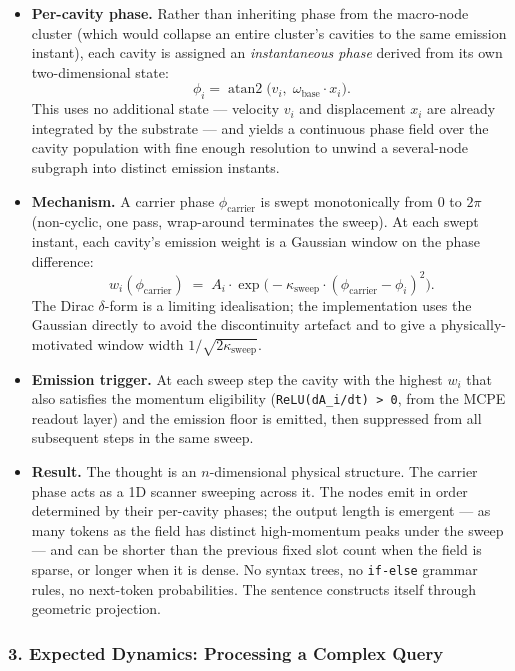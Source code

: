 \documentclass[
  11pt,
  a4paper,
]{article}
\begin{document}
\begin{itemize}
\item
  \textbf{Per-cavity phase.} Rather than inheriting phase from the
  macro-node cluster (which would collapse an entire cluster's cavities
  to the same emission instant), each cavity is assigned an
  \emph{instantaneous phase} derived from its own two-dimensional state:
  \[ \phi_i = \operatorname{atan2}\!\bigl(v_i,\; \omega_{\text{base}} \cdot x_i\bigr). \]
  This uses no additional state --- velocity \(v_i\) and displacement
  \(x_i\) are already integrated by the substrate --- and yields a
  continuous phase field over the cavity population with fine enough
  resolution to unwind a several-node subgraph into distinct emission
  instants.
\item
  \textbf{Mechanism.} A carrier phase \(\phi_{\text{carrier}}\) is swept
  monotonically from \(0\) to \(2\pi\) (non-cyclic, one pass,
  wrap-around terminates the sweep). At each swept instant, each
  cavity's emission weight is a Gaussian window on the phase difference:
  \[ w_i(\phi_{\text{carrier}}) \;=\; A_i \cdot \exp\!\bigl(-\kappa_{\text{sweep}} \cdot (\phi_{\text{carrier}} - \phi_i)^2\bigr). \]
  The Dirac \(\delta\)-form is a limiting idealisation; the
  implementation uses the Gaussian directly to avoid the discontinuity
  artefact and to give a physically-motivated window width
  \(1/\sqrt{2\kappa_{\text{sweep}}}\).
\item
  \textbf{Emission trigger.} At each sweep step the cavity with the
  highest \(w_i\) that also satisfies the momentum eligibility
  (\texttt{ReLU(dA\_i/dt)\ \textgreater{}\ 0}, from the MCPE readout
  layer) and the emission floor is emitted, then suppressed from all
  subsequent steps in the same sweep.
\item
  \textbf{Result.} The thought is an \(n\)-dimensional physical
  structure. The carrier phase acts as a 1D scanner sweeping across it.
  The nodes emit in order determined by their per-cavity phases; the
  output length is emergent --- as many tokens as the field has distinct
  high-momentum peaks under the sweep --- and can be shorter than the
  previous fixed slot count when the field is sparse, or longer when it
  is dense. No syntax trees, no \texttt{if-else} grammar rules, no
  next-token probabilities. The sentence constructs itself through
  geometric projection.
\end{itemize}

\subsubsection{3. Expected Dynamics: Processing a Complex
Query}\label{expected-dynamics-processing-a-complex-query}
\end{document}
